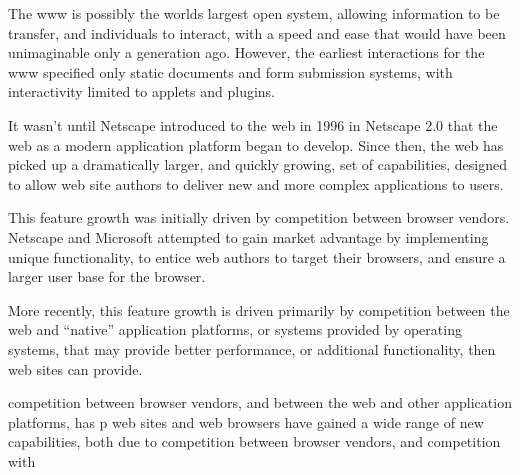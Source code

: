 \summary
The \gls{www} is possibly the worlds largest open system, allowing information
to be transfer, and individuals to interact, with a speed and ease that would
have been unimaginable only a generation ago.  However, the earliest interactions
for the \gls{www} specified only static documents and form submission systems,
with interactivity limited to applets and plugins.

It wasn't until Netscape introduced \JS to the web in 1996 in Netscape 2.0
that the web as a modern application platform began to develop. Since then,
the web has picked up a dramatically larger, and quickly growing, set of capabilities,
designed to allow web site authors to deliver new and more complex applications
to users.

This feature growth was initially driven by competition between
browser vendors.  Netscape and Microsoft attempted to gain market advantage
by implementing unique functionality, to entice web authors
to target their browsers, and ensure a larger user base for the browser.

More recently, this feature growth is driven primarily by competition between the
web and ``native'' application platforms, or systems provided by operating
systems, that may provide better performance, or additional functionality, then
web sites can provide.


competition between browser vendors, and between the web and other application
platforms, has p
web sites and web browsers have gained a wide range of new capabilities,
both due to competition between browser vendors, and competition with